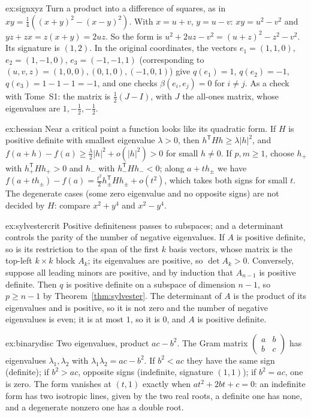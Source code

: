 \begin{solution}{ex:signxyz}
\idea Turn a product into a difference of squares, as in $xy=\frac14((x+y)^2-(x-y)^2)$.
\writeup With $x=u+v$, $y=u-v$: $xy=u^2-v^2$ and $yz+zx=z(x+y)=2uz$. So the form is $u^2+2uz-v^2=(u+z)^2-z^2-v^2$. Its signature is $(1,2)$. In the
original coordinates, the vectors $e_1=(1,1,0)$, $e_2=(1,-1,0)$, $e_3=(-1,-1,1)$ (corresponding to $(u,v,z)=(1,0,0),(0,1,0),(-1,0,1)$) give
$q(e_1)=1$, $q(e_2)=-1$, $q(e_3)=1-1-1=-1$, and one checks $\beta(e_i,e_j)=0$ for $i\ne j$. As a check with Tome~S1: the matrix is
$\frac12(J-I)$, with $J$ the all-ones matrix, whose eigenvalues are $1,-\frac12,-\frac12$.
\end{solution}

\begin{solution}{ex:hessian}
\idea Near a critical point a function looks like its quadratic form.
\writeup If $H$ is positive definite with smallest eigenvalue $\lambda>0$, then $h^{\mathsf T}Hh\ge\lambda|h|^2$, and
$f(a+h)-f(a)\ge\frac\lambda2|h|^2+o(|h|^2)>0$ for small $h\ne0$. If $p,m\ge1$, choose $h_+$ with $h_+^{\mathsf T}Hh_+>0$ and $h_-$ with
$h_-^{\mathsf T}Hh_-<0$; along $a+th_\pm$ we have $f(a+th_\pm)-f(a)=\frac{t^2}2h_\pm^{\mathsf T}Hh_\pm+o(t^2)$, which takes both signs for small $t$.
The degenerate cases (some zero eigenvalue and no opposite signs) are not decided by $H$: compare $x^2+y^4$ and $x^2-y^4$.
\end{solution}

\begin{solution}{ex:sylvestercrit}
\idea Positive definiteness passes to subspaces; and a determinant controls the parity of the number of negative eigenvalues.
\writeup If $A$ is positive definite, so is its restriction to the span of the first $k$ basis vectors, whose matrix is the top-left $k\times k$
block $A_k$; its eigenvalues are positive, so $\det A_k>0$. Conversely, suppose all leading minors are positive, and by induction that $A_{n-1}$ is
positive definite. Then $q$ is positive definite on a subspace of dimension $n-1$, so $p\ge n-1$ by Theorem~\ref{thm:sylvester}. The determinant of $A$
is the product of its eigenvalues and is positive, so it is not zero and the number of negative eigenvalues is even; it is at most $1$, so it is $0$,
and $A$ is positive definite.
\end{solution}

\begin{solution}{ex:binarydisc}
\idea Two eigenvalues, product $ac-b^2$.
\writeup The Gram matrix $\begin{pmatrix}a&b\\b&c\end{pmatrix}$ has eigenvalues $\lambda_1,\lambda_2$ with $\lambda_1\lambda_2=ac-b^2$. If $b^2<ac$ they
have the same sign (definite); if $b^2>ac$, opposite signs (indefinite, signature $(1,1)$); if $b^2=ac$, one is zero. The form vanishes at $(t,1)$
exactly when $at^2+2bt+c=0$: an indefinite form has two isotropic lines, given by the two real roots, a definite one has none, and a degenerate
nonzero one has a double root.
\end{solution}

